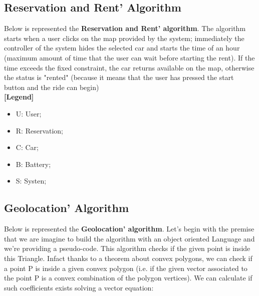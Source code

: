 \subsection{Reservation and Rent' Algorithm}
Below is represented the \textbf{Reservation and Rent' algorithm}. The algorithm starts when a user clicks on the map provided by the system; immediately the controller of the system hides the selected car and starts the time of an hour (maximum amount of time that the user can wait before starting the rent). If the time exceeds the fixed constraint, the car returns available on the map, otherwise the status is "rented" (because it means that the user has pressed the start button and the ride can begin) \\
\textbf{[Legend]}
\begin{itemize}
	\item U: User;
	\item R: Reservation;
	\item C:  Car;
	\item B: Battery;
	\item S: Systen;
\end{itemize}


\newpage
\subsection{Geolocation' Algorithm}
Below is represented the \textbf{Geolocation' algorithm}. Let's begin with the premise that we are imagine to build the algorithm with an object oriented Language and we're providing a pseudo-code. This algorithm checks if the given point is inside this Triangle. Infact thanks to a theorem about convex polygons, we can check if a point P is inside a given convex polygon (i.e. if the given vector associated to the point P is a convex combination of the polygon vertices). We can calculate if such coefficients exists solving a vector equation:

